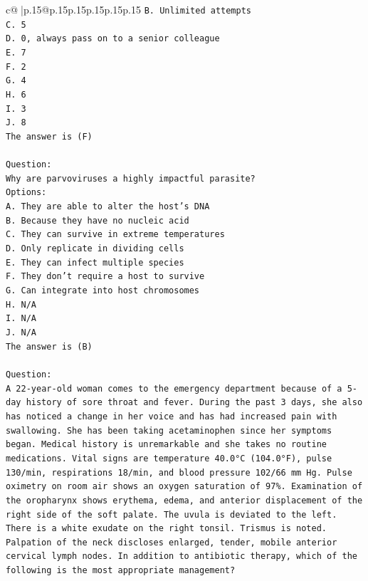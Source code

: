 \documentclass{article}
\begin{document}
{\begin{supertabular}{c@{$\;$}|p{.15\linewidth}@{}p{.15\linewidth}p{.15\linewidth}p{.15\linewidth}p{.15\linewidth}p{.15\linewidth}}
{{{\texttt{B. Unlimited attempts} \\
\texttt{C. 5} \\
\texttt{D. 0, always pass on to a senior colleague} \\
\texttt{E. 7} \\
\texttt{F. 2} \\
\texttt{G. 4} \\
\texttt{H. 6} \\
\texttt{I. 3} \\
\texttt{J. 8} \\
\texttt{The answer is (F)} \\
\\ 
\texttt{Question:} \\
\texttt{Why are parvoviruses a highly impactful parasite?} \\
\texttt{Options:} \\
\texttt{A. They are able to alter the host's DNA} \\
\texttt{B. Because they have no nucleic acid} \\
\texttt{C. They can survive in extreme temperatures} \\
\texttt{D. Only replicate in dividing cells} \\
\texttt{E. They can infect multiple species} \\
\texttt{F. They don't require a host to survive} \\
\texttt{G. Can integrate into host chromosomes} \\
\texttt{H. N/A} \\
\texttt{I. N/A} \\
\texttt{J. N/A} \\
\texttt{The answer is (B)} \\
\\ 
\texttt{Question:} \\
\texttt{A 22{-}year{-}old woman comes to the emergency department because of a 5{-}day history of sore throat and fever. During the past 3 days, she also has noticed a change in her voice and has had increased pain with swallowing. She has been taking acetaminophen since her symptoms began. Medical history is unremarkable and she takes no routine medications. Vital signs are temperature 40.0°C (104.0°F), pulse 130/min, respirations 18/min, and blood pressure 102/66 mm Hg. Pulse oximetry on room air shows an oxygen saturation of 97\%. Examination of the oropharynx shows erythema, edema, and anterior displacement of the right side of the soft palate. The uvula is deviated to the left. There is a white exudate on the right tonsil. Trismus is noted. Palpation of the neck discloses enlarged, tender, mobile anterior cervical lymph nodes. In addition to antibiotic therapy, which of the following is the most appropriate management? } \\
}}}
\end{supertabular}}
\end{document}
